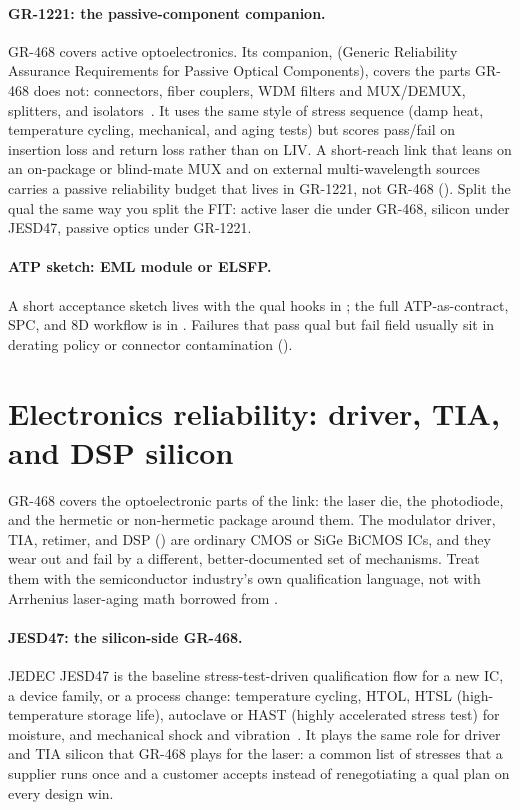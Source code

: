 \paragraph{GR-1221: the passive-component companion.}
GR-468 covers active optoelectronics. Its companion, 
(Generic Reliability Assurance Requirements for Passive Optical Components), covers
the parts GR-468 does not: connectors, fiber couplers, WDM filters and MUX/DEMUX,
splitters, and isolators~. It uses the same style of stress
sequence (damp heat, temperature cycling, mechanical, and aging tests) but scores
pass/fail on insertion loss and return loss rather than on LIV. A short-reach link
that leans on an on-package or blind-mate MUX and on external multi-wavelength
sources carries a passive reliability budget that lives in GR-1221, not GR-468
(). Split the qual the same way you split
the FIT: active laser die under GR-468, silicon under JESD47, passive optics under
GR-1221.

\paragraph{ATP sketch: EML module or ELSFP.}
A short acceptance sketch lives with the qual hooks in ; the full
ATP-as-contract, SPC, and 8D workflow is in . Failures that
pass qual but fail field usually sit in derating policy or connector contamination
().

\section{Electronics reliability: driver, TIA, and DSP silicon}
\label{sec:ic-reliability}

GR-468 covers the optoelectronic parts of the link: the laser die, the
photodiode, and the hermetic or non-hermetic package around them. The modulator
driver, TIA, retimer, and DSP () are ordinary CMOS or
SiGe BiCMOS ICs, and they wear out and fail by a different, better-documented set
of mechanisms. Treat them with the semiconductor industry's own qualification
language, not with Arrhenius laser-aging math borrowed from .

\paragraph{JESD47: the silicon-side GR-468.}
 JEDEC JESD47 is the baseline stress-test-driven qualification
flow for a new IC, a device family, or a process change: temperature cycling,
HTOL, HTSL (high-temperature storage life), autoclave or HAST (highly accelerated
stress test) for moisture, and mechanical shock and vibration~.
It plays the same role for driver and TIA silicon that GR-468 plays for the
laser: a common list of stresses that a supplier runs once and a customer accepts
instead of renegotiating a qual plan on every design win.

